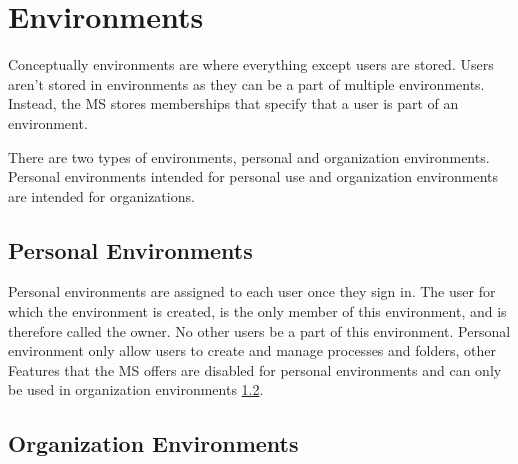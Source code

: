 





\section{Environments}
\label{cha:conceptanddesign:environments}

Conceptually environments are where everything except users are stored.
Users aren't stored in environments as they can be a part of multiple environments.
Instead, the MS stores memberships that specify that a user is part of an environment.

There are two types of environments, personal and organization environments.
Personal environments intended for personal use and organization environments are intended
for organizations.

\subsection{Personal Environments}
\label{cha:conceptanddesign:environments:personal}

Personal environments are assigned to each user once they sign in. 
The user for which the environment is created, is the only member of this
environment, and is therefore called the owner.
No other users be a part of this environment.
Personal environment only allow users to create and manage processes and folders,
other Features that the MS offers are disabled for personal environments and can only be
used in organization environments \ref{cha:conceptanddesign:environments:organization}.

\subsection{Organization Environments}
\label{cha:conceptanddesign:environments:organization}

